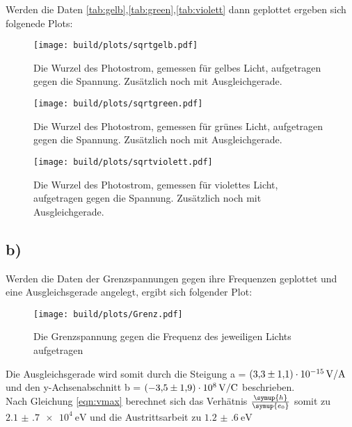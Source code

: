     \noindent
    Werden die Daten \ref{tab:gelb},\ref{tab:green},\ref{tab:violett} dann geplottet ergeben sich folgenede Plots:
    \noindent

    \begin{figure}[H]
        \centering
        \texttt{[image: build/plots/sqrtgelb.pdf]}
        \caption{Die Wurzel des Photostrom, gemessen für gelbes Licht, aufgetragen gegen die Spannung. Zusätzlich noch mit Ausgleichgerade.}
        \label{img:sqrtgelb}
    \end{figure}

    \begin{figure}[H]
        \centering
        \texttt{[image: build/plots/sqrtgreen.pdf]}
        \caption{Die Wurzel des Photostrom, gemessen für grünes Licht, aufgetragen gegen die Spannung. Zusätzlich noch mit Ausgleichgerade.}
        \label{img:sqrtgruen}
    \end{figure}

    \begin{figure}[H]
        \centering
        \texttt{[image: build/plots/sqrtviolett.pdf]}
        \caption{Die Wurzel des Photostrom, gemessen für violettes Licht, aufgetragen gegen die Spannung. Zusätzlich noch mit Ausgleichgerade.}
        \label{img:sqrtviolett}
    \end{figure}
\newpage
\subsection{b)}

    \noindent
    Werden die Daten der Grenzspannungen gegen ihre Frequenzen geplottet und eine Ausgleichsgerade angelegt, ergibt sich folgender Plot:
    \noindent

    \begin{figure}[H]
        \centering
        \texttt{[image: build/plots/Grenz.pdf]}
        \caption{Die Grenzspannung gegen die Frequenz des jeweiligen Lichts aufgetragen}
        \label{img:gegen}
    \end{figure}


    \noindent
    Die Ausgleichsgerade wird somit durch die Steigung a = $\SI{3.3 (11)e-15}{\volt\per\ampere}$ und den y-Achsenabschnitt 
    b = $\SI{-3.5 (19)e8}{\volt\per\coulomb}$ beschrieben.\\
    Nach Gleichung \ref{eqn:vmax} berechnet sich das Verhätnis $\frac{\symup{h}}{\symup{e_0}}$ somit zu $\SI{2.1(7)e4}{\electronvolt}$ und die 
    Austrittsarbeit zu $\SI{1.2(6)}{\electronvolt}$
    \noindent

